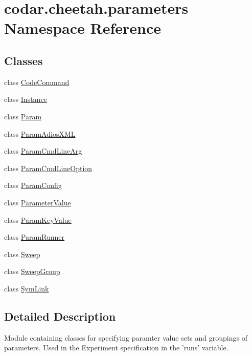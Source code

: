 \hypertarget{namespacecodar_1_1cheetah_1_1parameters}{}\section{codar.\+cheetah.\+parameters Namespace Reference}
\label{namespacecodar_1_1cheetah_1_1parameters}
\subsection*{Classes}
\begin{DoxyCompactItemize}
\item 
class \hyperlink{classcodar_1_1cheetah_1_1parameters_1_1_code_command}{Code\+Command}
\item 
class \hyperlink{classcodar_1_1cheetah_1_1parameters_1_1_instance}{Instance}
\item 
class \hyperlink{classcodar_1_1cheetah_1_1parameters_1_1_param}{Param}
\item 
class \hyperlink{classcodar_1_1cheetah_1_1parameters_1_1_param_adios_x_m_l}{Param\+Adios\+X\+ML}
\item 
class \hyperlink{classcodar_1_1cheetah_1_1parameters_1_1_param_cmd_line_arg}{Param\+Cmd\+Line\+Arg}
\item 
class \hyperlink{classcodar_1_1cheetah_1_1parameters_1_1_param_cmd_line_option}{Param\+Cmd\+Line\+Option}
\item 
class \hyperlink{classcodar_1_1cheetah_1_1parameters_1_1_param_config}{Param\+Config}
\item 
class \hyperlink{classcodar_1_1cheetah_1_1parameters_1_1_parameter_value}{Parameter\+Value}
\item 
class \hyperlink{classcodar_1_1cheetah_1_1parameters_1_1_param_key_value}{Param\+Key\+Value}
\item 
class \hyperlink{classcodar_1_1cheetah_1_1parameters_1_1_param_runner}{Param\+Runner}
\item 
class \hyperlink{classcodar_1_1cheetah_1_1parameters_1_1_sweep}{Sweep}
\item 
class \hyperlink{classcodar_1_1cheetah_1_1parameters_1_1_sweep_group}{Sweep\+Group}
\item 
class \hyperlink{classcodar_1_1cheetah_1_1parameters_1_1_sym_link}{Sym\+Link}
\end{DoxyCompactItemize}


\subsection{Detailed Description}
\begin{DoxyVerb}Module containing classes for specifying paramter value sets and groupings
of parameters. Used in the Experiment specification in the 'runs' variable.
\end{DoxyVerb}
 